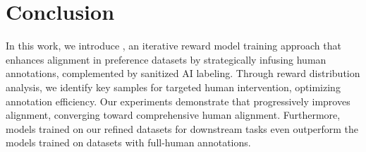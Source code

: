 \section{Conclusion}
 
In this work, we introduce \myname{}, an iterative reward model training approach that enhances alignment in preference datasets by strategically infusing human annotations, complemented by sanitized AI labeling. Through reward distribution analysis, we identify key samples for targeted human intervention, optimizing annotation efficiency. Our experiments demonstrate that \myname{} progressively improves alignment, converging toward comprehensive human alignment. Furthermore, models trained on our refined datasets for downstream tasks even outperform the models trained on datasets with full-human annotations.